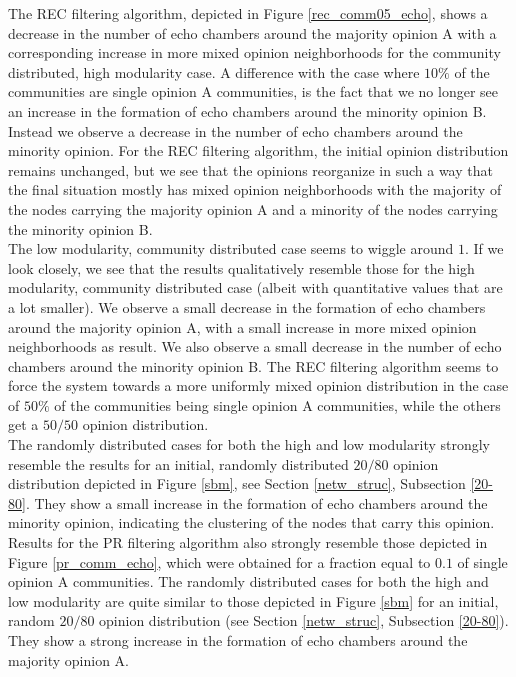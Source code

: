 \documentclass[11 pt , letterpaper , twoside , openright]{book}
\begin{document}
The REC filtering algorithm, depicted in Figure \ref{rec_comm05_echo}, shows a decrease in the number of echo chambers around the majority opinion A with a corresponding increase in more mixed opinion neighborhoods for the community distributed, high modularity case. A difference with the case where $10 \%$ of the communities are single opinion A communities, is the fact that we no longer see an increase in the formation of echo chambers around the minority opinion B. Instead we observe a decrease in the number of echo chambers around the minority opinion. For the REC filtering algorithm, the initial opinion distribution remains unchanged, but we see that the opinions reorganize in such a way that the final situation mostly has mixed opinion neighborhoods with the majority of the nodes carrying the majority opinion A and a minority of the nodes carrying the minority opinion B. \\
\newline
The low modularity, community distributed case seems to wiggle around $1$. If we look closely, we see that the results qualitatively resemble those for the high modularity, community distributed case (albeit with quantitative values that are a lot smaller). We observe a small decrease in the formation of echo chambers around the majority opinion A, with a small increase in more mixed opinion neighborhoods as result. We also observe a small decrease in the number of echo chambers around the minority opinion B. The REC filtering algorithm seems to force the system towards a more uniformly mixed opinion distribution in the case of $50 \%$ of the communities being single opinion A communities, while the others get a $50/50$ opinion distribution.\\
\newline
The randomly distributed cases for both the high and low modularity strongly resemble the results for an initial, randomly distributed $20/80$ opinion distribution depicted in Figure \ref{sbm}, see Section \ref{netw_struc}, Subsection \ref{20-80}. They show a small increase in the formation of echo chambers around the minority opinion, indicating the clustering of the nodes that carry this opinion.\\
\newline
Results for the PR filtering algorithm also strongly resemble those depicted in Figure \ref{pr_comm_echo}, which were obtained for a fraction equal to $0.1$ of single opinion A communities. The randomly distributed cases for both the high and low modularity are quite similar to those depicted in Figure \ref{sbm} for an initial, random $20/80$ opinion distribution (see Section \ref{netw_struc}, Subsection \ref{20-80}). They show a strong increase in the formation of echo chambers around the majority opinion A.\\
\end{document}
